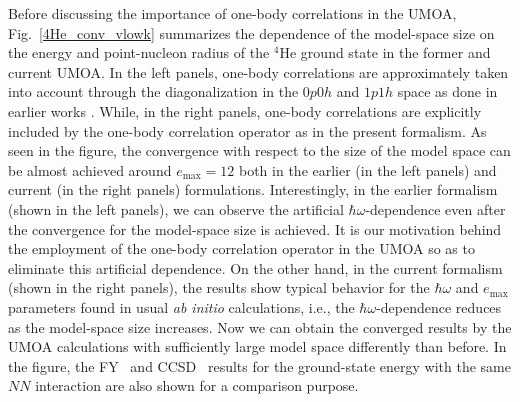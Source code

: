 \documentclass[aps,prc, dvips, twocolumn,groupedaddress,showkeys,showpacs,floatfix,superscriptaddress]{revtex4-1}
\newcommand{\<}{\langle}
\renewcommand{\>}{\rangle}
\begin{document}
Before discussing the importance of one-body correlations in the UMOA,
Fig.~\ref{4He_conv_vlowk} summarizes the dependence of the model-space size
on the energy and point-nucleon radius of the $^4$He ground state in the former and current UMOA.
In the left panels, one-body correlations are approximately taken into account
through the diagonalization in the $0p0h$ and $1p1h$ space as done in earlier works \cite{Fujii:2004, Fujii:2009, Miyagi:2014, Miyagi:2015}.
While, in the right panels, one-body correlations are explicitly included by the one-body correlation operator as in the present formalism.
As seen in the figure, the convergence with respect to the size of the model space can be almost achieved around $e_{\max} = 12$
both in the earlier (in the left panels) and current (in the right panels) formulations.
Interestingly, in the earlier formalism (shown in the left panels),
we can observe the artificial $\hbar\omega$-dependence even after the convergence for the model-space size is achieved.
It is our motivation behind the employment of the one-body correlation operator in the UMOA
so as to eliminate this artificial dependence.
On the other hand, in the current formalism (shown in the right panels),
the results show typical behavior for the $\hbar\omega$ and $e_{\max}$ parameters
found in usual {\it ab initio} calculations, i.e., the $\hbar\omega$-dependence reduces as the model-space size increases.
Now we can obtain the converged results by the UMOA calculations with sufficiently large model space differently than before.
In the figure, the FY~\cite{Nogga:2004} and CCSD~\cite{Hagen:2007} results for the ground-state energy with the same $NN$ interaction are also shown for a comparison purpose.
\end{document}
